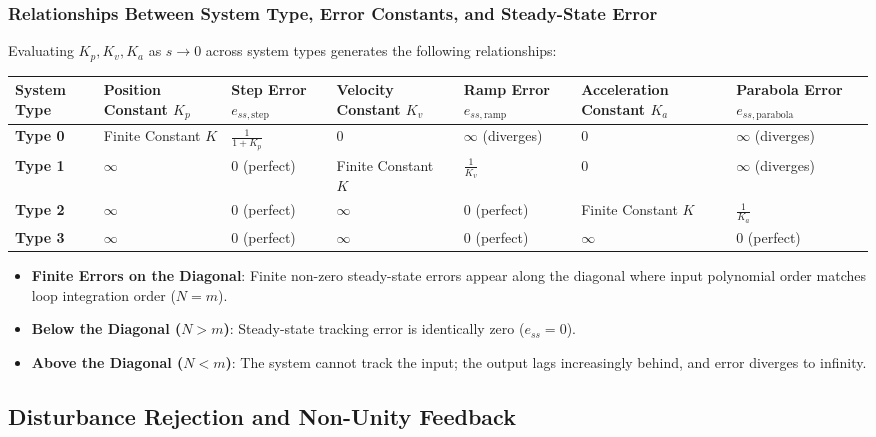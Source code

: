 \documentclass[12pt,onecolumn,twoside ]{article}
\begin{document}
	\subsubsection{Relationships Between System Type, Error Constants, and Steady-State Error}
	Evaluating $K_p, K_v, K_a$ as $s \to 0$ across system types generates the following relationships:
	\begin{center}\small\begin{tabularx}{\textwidth}{*{7}{Y}}
			\toprule
			\textbf{System Type} & \textbf{Position Constant $K_p$} & \textbf{Step Error $e_{ss,\text{step}}$} & \textbf{Velocity Constant $K_v$} & \textbf{Ramp Error $e_{ss,\text{ramp}}$} & \textbf{Acceleration Constant $K_a$} & \textbf{Parabola Error $e_{ss,\text{parabola}}$} \\
			\midrule
			\textbf{Type 0} & Finite Constant $K$ & \textbf{$\frac{1}{1 + K_p}$} & $0$ & \textbf{$\infty$} (diverges) & $0$ & \textbf{$\infty$} (diverges) \\
			\textbf{Type 1} & $\infty$ & \textbf{$0$} (perfect) & Finite Constant $K$ & \textbf{$\frac{1}{K_v}$} & $0$ & \textbf{$\infty$} (diverges) \\
			\textbf{Type 2} & $\infty$ & \textbf{$0$} (perfect) & $\infty$ & \textbf{$0$} (perfect) & Finite Constant $K$ & \textbf{$\frac{1}{K_a}$} \\
			\textbf{Type 3} & $\infty$ & \textbf{$0$} (perfect) & $\infty$ & \textbf{$0$} (perfect) & $\infty$ & \textbf{$0$} (perfect) \\
			\bottomrule
	\end{tabularx}\end{center}
	
	\begin{itemize}
		\item
		\textbf{Finite Errors on the Diagonal}: Finite non-zero steady-state errors appear along the diagonal where input polynomial order matches loop integration order ($N = m$).
		\item
		\textbf{Below the Diagonal ($N > m$)}: Steady-state tracking error is identically zero ($e_{ss} = 0$).
		\item
		\textbf{Above the Diagonal ($N < m$)}: The system cannot track the input; the output lags increasingly behind, and error diverges to infinity.
	\end{itemize}
	
	\subsection{Disturbance Rejection and Non-Unity Feedback}
\end{document}
